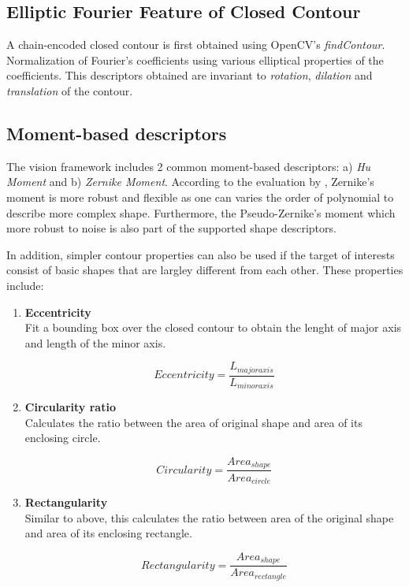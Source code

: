 \documentclass[fypca]{socreport}
\begin{document}
\subsection{Elliptic Fourier Feature of Closed Contour}

A chain-encoded closed contour is first obtained using OpenCV's
\textit{findContour}. Normalization of Fourier's coefficients using various
elliptical properties of the coefficients. This descriptors obtained are
invariant to \textit{rotation}, \textit{dilation} and \textit{translation} of
the contour.

\subsection{Moment-based descriptors}

The vision framework includes 2 common moment-based descriptors: a) \textit{Hu Moment}
and b) \textit{Zernike Moment}. According to the evaluation by
, Zernike's moment is more robust and flexible
as one can varies the order of polynomial to describe more complex shape.
Furthermore, the Pseudo-Zernike's moment which more robust to noise is also part
of the supported shape descriptors.

In addition, simpler contour properties can also be used if the target of
interests consist of basic shapes that are largley different from each other.
These properties include:

\begin{enumerate}

  \item \textbf{Eccentricity} \\
  Fit a bounding box over the closed contour to obtain the lenght of major axis
  and length of the minor axis.

  \[
    Eccentricity = \frac{L_{major axis}}{L_{minor axis}}
  \]

  \item \textbf{Circularity ratio} \\
  Calculates the ratio between the area of original shape and area of its enclosing circle.

  \[
    Circularity = \frac{Area_{shape}}{Area_{circle}}
  \]

  \item \textbf{Rectangularity} \\
  Similar to above, this calculates the ratio between area of the original shape
  and area of its enclosing rectangle.

  \[
    Rectangularity = \frac{Area_{shape}}{Area_{rectangle}}
  \]

\end{enumerate}
\end{document}

